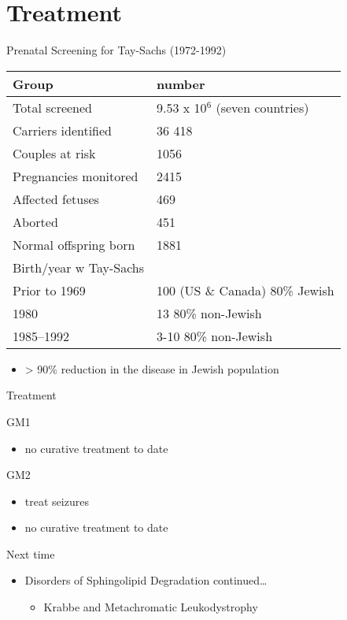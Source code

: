 \documentclass[presentation, smaller]{beamer}
\begin{document}
\section{Treatment}
\label{sec:orgheadline21}
\begin{frame}[label={sec:orgheadline18}]{Prenatal Screening for Tay-Sachs (1972-1992)}
\begin{center}
\begin{tabular}{ll}
Group & number\\
\hline
Total screened & 9.53 x 10\(^{\text{6}}\) (seven countries)\\
Carriers identified & 36 418\\
Couples at risk & 1056\\
Pregnancies monitored & 2415 \footnotemark[2]{}\\
Affected fetuses & 469\\
Aborted & 451\\
Normal offspring born & 1881\\
Birth/year w Tay-Sachs & \\
Prior to 1969 & 100 (US \& Canada) 80\% Jewish\\
1980 & 13 80\% non-Jewish\\
1985–1992 & 3-10 80\% non-Jewish\\
\end{tabular}
\end{center}

\begin{itemize}
\item > 90\% reduction in the disease in Jewish population
\end{itemize}
\end{frame}

\begin{frame}[label={sec:orgheadline19}]{Treatment}
\begin{block}{GM1}
\begin{itemize}
\item no curative treatment to date
\end{itemize}
\end{block}
\begin{block}{GM2}
\begin{itemize}
\item treat seizures
\item no curative treatment to date
\end{itemize}
\end{block}
\end{frame}


\begin{frame}[label={sec:orgheadline20}]{Next time}
\begin{itemize}
\item Disorders of Sphingolipid Degradation continued\ldots{}
\begin{itemize}
\item Krabbe and Metachromatic Leukodystrophy
\end{itemize}
\end{itemize}
\end{frame}
\end{document}
